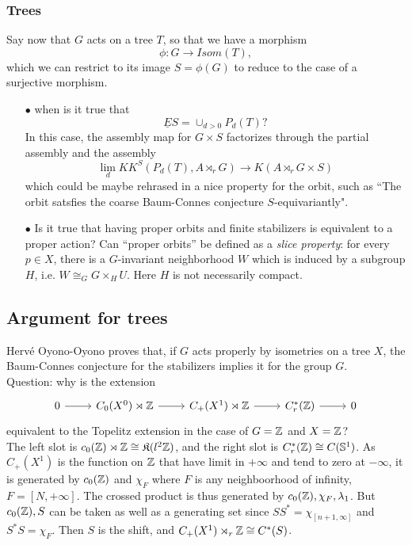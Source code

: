 \subsubsection{Trees}

Say now that $G$ acts on a tree $T$, so that we have a morphism
\[\phi: G\rightarrow Isom(T),\]
which we can restrict to its image $S= \phi(G)$ to reduce to the case of a surjective morphism. 
\begin{itemize}
\item[$\bullet$] when is it true that 
	\[\underline E S = \cup_{d>0}P_d(T)?\]
In this case, the assembly map for $G\times S$ factorizes through the partial assembly and the assembly
\[ \lim_d KK^S(P_d(T), A\rtimes_r G) \rightarrow K(A\rtimes_r G\times S)\]
which could be maybe rehrased in a nice property for the orbit, such as ``The orbit satsfies the coarse Baum-Connes conjecture $S$-equivariantly".   
\item[$\bullet$] Is it true that having proper orbits and finite stabilizers is equivalent to a proper action? Can ``proper orbits'' be defined as a \textit{slice property}: for every $p\in X$, there is a $G$-invariant neighborhood $W$ which is induced by a subgroup $H$, i.e. $W\cong_G G\times_H U$. Here $H$ is not necessarily compact. 
\end{itemize}

\subsection{Argument for trees}

Herv\'e Oyono-Oyono proves that, if $G$ acts properly by isometries on a tree $X$, the Baum-Connes conjecture for the stabilizers implies it for the group $G$.\\

Question: why is the extension 
\[\begin{tikzcd} 0 \arrow{r} & C_0(X^0)\rtimes \Z \arrow{r}& C_+(X^1)\rtimes \Z \arrow{r} & C^*_r(\Z) \arrow{r}& 0 \end{tikzcd}\]
equivalent to the Topelitz extension in the case of $G=\mathbb Z$ and $X = \mathbb Z$?\\

The left slot is $c_0(\mathbb Z)\rtimes \mathbb Z \cong \mathfrak K(l^2\mathbb Z)$, and the right slot is $C^*_r(\mathbb Z)\cong C(\mathbb S^1)$. As $C_+(X^1)$ is the function on $\mathbb Z$ that have limit in $+\infty$ and tend to zero at $-\infty$, it is generated by $c_0(\mathbb Z)$ and $\chi_F$ where $F$ is any neighboorhood of infinity, $F=[N,+\infty]$. The crossed product is thus generated by $c_0(\mathbb Z), \chi_F, \lambda_1$. But $c_0(\mathbb Z), S$ can be taken as well as a generating set since $SS^* = \chi_{[n+1,\infty]}$ and $S^*S =\chi_F$. Then $S$ is the shift, and $C_+(X^1)\rtimes_r \mathbb Z\cong C^*(S)$.\\

